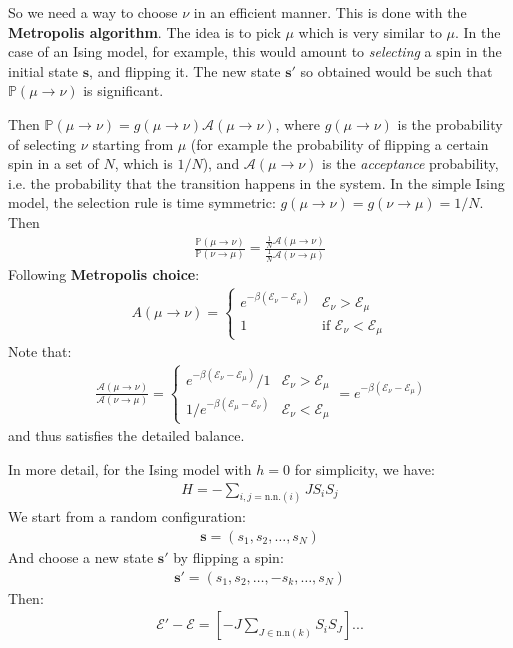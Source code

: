\documentclass[../template.tex]{subfiles}
\begin{document}
\medskip

So we need a way to choose $\nu$ in an efficient manner. This is done with the \textbf{Metropolis algorithm}. The idea is to pick $\mu$ which is very similar to $\mu$. In the case of an Ising model, for example, this would amount to \textit{selecting} a spin in the initial state $\bm{s}$, and flipping it. The new state $\bm{s}'$ so obtained would be such that $\mathbb{P}(\mu \to \nu)$ is significant.

\medskip

Then $\mathbb{P}(\mu \to \nu) = g(\mu \to \nu) \mathcal{A}(\mu \to \nu)$, where $g(\mu \to \nu)$ is the probability of selecting $\nu$ starting from $\mu$ (for example the probability of flipping a certain spin in a set of $N$, which is $1/N$), and $\mathcal{A}(\mu \to \nu)$ is the \textit{acceptance} probability, i.e. the probability that the transition happens in the system. In the simple Ising model, the selection rule is time symmetric: $g(\mu \to \nu) = g(\nu \to \mu) = 1/N$. Then
\begin{align*}
    \frac{\mathbb{P}(\mu \to \nu)}{\mathbb{P}(\nu \to \mu)} = \frac{\frac{1}{N} \mathcal{A}(\mu \to \nu)}{\frac{1}{N} \mathcal{A}(\nu \to \mu)}  
\end{align*}
Following \textbf{Metropolis choice}:
\begin{align*}
    A(\mu \to \nu) = \begin{cases}
        e^{-\beta (\mathcal{E}_\nu - \mathcal{E}_\mu)} & \mathcal{E}_\nu > \mathcal{E}_\mu\\
        1 & \text{if } \mathcal{E}_\nu < \mathcal{E}_\mu
    \end{cases}
\end{align*}  
Note that:
\begin{align*}
    \frac{\mathcal{A}(\mu \to \nu)}{\mathcal{A}(\nu \to \mu)} = \begin{cases}
        e^{-\beta (\mathcal{E}_\nu - \mathcal{E}_\mu)} / 1 & \mathcal{E}_\nu > \mathcal{E}_\mu\\
        1/e^{-\beta (\mathcal{E}_\mu - \mathcal{E}_\nu)} & \mathcal{E}_\nu < \mathcal{E}_\mu
    \end{cases} = e^{-\beta (\mathcal{E}_\nu - \mathcal{E}_\mu)}
\end{align*}
and thus satisfies the detailed balance. 

\medskip

In more detail, for the Ising model with $h=0$ for simplicity, we have:
\begin{align*} %
    H = -\sum_{i,j = \mathrm{n.n.}(i) } J S_i S_j
\end{align*}
We start from a random configuration:
\begin{align*}
    \bm{s} = (s_1, s_2,\dots, s_N)
\end{align*}
And choose a new state $\bm{s}'$ by flipping a spin:
\begin{align*}
    \bm{s}' = (s_1, s_2, \dots, -s_k, \dots, s_N)
\end{align*}
Then:
\begin{align*}
    \mathcal{E}'-\mathcal{E}= [-J \sum_{J \in \mathrm{n.n}(k) } S_i S_J] ...
\end{align*}
\end{document}
